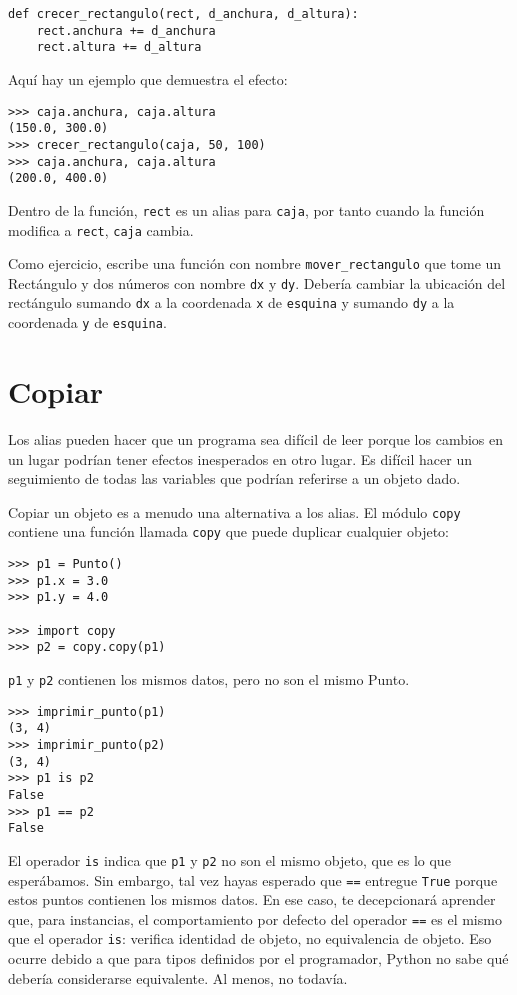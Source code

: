 \documentclass[10pt]{book}
\begin{document}
\begin{verbatim}
def crecer_rectangulo(rect, d_anchura, d_altura):
    rect.anchura += d_anchura
    rect.altura += d_altura
\end{verbatim}
%
Aquí hay un ejemplo que demuestra el efecto:

\begin{verbatim}
>>> caja.anchura, caja.altura
(150.0, 300.0)
>>> crecer_rectangulo(caja, 50, 100)
>>> caja.anchura, caja.altura
(200.0, 400.0)
\end{verbatim}
%
Dentro de la función, {\tt rect} es un
alias para {\tt caja}, por tanto cuando la función modifica a {\tt rect},
{\tt caja} cambia.

Como ejercicio, escribe una función con nombre \verb"mover_rectangulo" que tome
un Rectángulo y dos números con nombre {\tt dx} y {\tt dy}.  Debería
cambiar la ubicación del rectángulo sumando {\tt dx}
a la coordenada {\tt x} de {\tt esquina} y sumando {\tt dy}
a la coordenada {\tt y} de {\tt esquina}.


\section{Copiar}
\label{copying}

Los alias pueden hacer que un programa sea difícil de leer porque los cambios
en un lugar podrían tener efectos inesperados en otro lugar.
Es difícil hacer un seguimiento de todas las variables que podrían referirse
a un objeto dado.

Copiar un objeto es a menudo una alternativa a los alias.
El módulo {\tt copy} contiene una función llamada {\tt copy} que
puede duplicar cualquier objeto:

\begin{verbatim}
>>> p1 = Punto()
>>> p1.x = 3.0
>>> p1.y = 4.0

>>> import copy
>>> p2 = copy.copy(p1)
\end{verbatim}
%
{\tt p1} y {\tt p2} contienen los mismos datos, pero no son
el mismo Punto.

\begin{verbatim}
>>> imprimir_punto(p1)
(3, 4)
>>> imprimir_punto(p2)
(3, 4)
>>> p1 is p2
False
>>> p1 == p2
False
\end{verbatim}
%
El operador {\tt is} indica que {\tt p1} y {\tt p2} no son el
mismo objeto, que es lo que esperábamos.  Sin embargo, tal vez hayas esperado
que {\tt ==} entregue {\tt True} porque estos puntos contienen los mismos
datos.  En ese caso, te decepcionará aprender que, para
instancias, el comportamiento por defecto del operador {\tt ==} es el mismo
que el operador {\tt is}: verifica identidad de objeto, no equivalencia
de objeto.  Eso ocurre debido a que para tipos definidos por el programador, Python no
sabe qué debería considerarse equivalente.  Al menos, no todavía.
\end{document}

